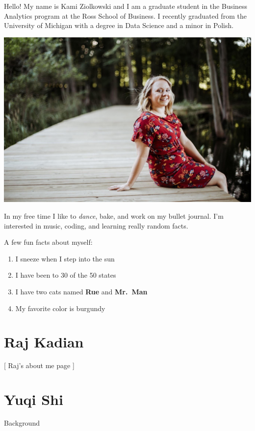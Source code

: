 \documentclass[
]{book}
\providecommand{\tightlist}{%
  \setlength{\itemsep}{0pt}\setlength{\parskip}{0pt}}
\begin{document}
Hello! My name is Kami Ziolkowski and I am a graduate student in the Business Analytics program at the Ross School of Business. I recently graduated from the University of Michigan with a degree in Data Science and a minor in Polish.

\includegraphics{me2.jpg}

In my free time I like to \emph{dance}, bake, and work on my bullet journal. I'm interested in music, coding, and learning really random facts.

A few fun facts about myself:

\begin{enumerate}
\def\labelenumi{\arabic{enumi}.}
\tightlist
\item
  I sneeze when I step into the sun
\item
  I have been to 30 of the 50 states
\item
  I have two cats named \textbf{Rue} and \textbf{Mr.~Man}
\item
  My favorite color is burgundy
\end{enumerate}

\hypertarget{raj-kadian}{%
\section{Raj Kadian}\label{raj-kadian}}

{[} Raj's about me page {]}

\hypertarget{yuqi-shi}{%
\section{Yuqi Shi}\label{yuqi-shi}}

Background
\end{document}

